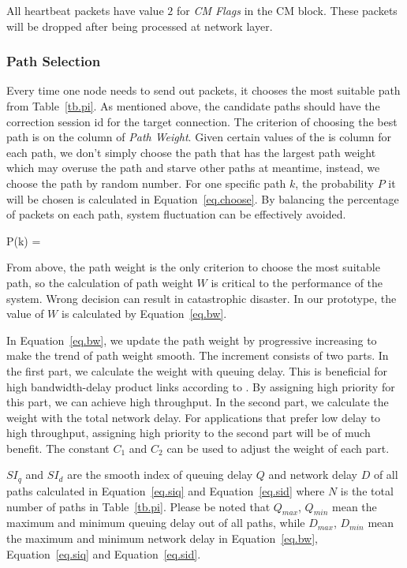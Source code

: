All heartbeat packets have value $2$ for \emph{CM Flags} in the CM block. These packets will be dropped after being processed at network layer.


\subsubsection{Path Selection}
\label{sec:selection}

Every time one node needs to send out packets, it chooses the most suitable path from Table~\ref{tb.pi}. As mentioned above, the candidate paths should have the correction session id for the target connection. The criterion of choosing the best path is on the column of \emph{Path Weight}. Given certain values of the is column for each path, we don\textquoteright t simply choose the path that has the largest path weight which may overuse the path and starve other paths at meantime, instead, we choose the path by random number. For one specific path $k$, the probability $P$ it will be chosen is calculated in Equation~\ref{eq.choose}. By balancing the percentage of packets on each path, system fluctuation can be effectively avoided.

\be
\label{eq.choose}
P(k) = 
\ee

From above, the path weight is the only criterion to choose the most suitable path, so the calculation of path weight $W$ is critical to the performance of the system. Wrong decision can result in catastrophic disaster. In our prototype, the value of $W$ is calculated by Equation~\ref{eq.bw}. 

In Equation~\ref{eq.bw}, we update the path weight by progressive increasing to make the trend of path weight smooth. The increment consists of two parts. In the first part, we calculate the weight with queuing delay. This is beneficial for high bandwidth-delay product links according to \cite{mptcp}. By assigning high priority for this part, we can achieve high throughput. In the second part, we calculate the weight with the total network delay. For applications that prefer low delay to high throughput, assigning high priority to the second part will be of much benefit. The constant $C_1$ and $C_2$ can be used to adjust the weight of each part.

$SI_q$ and $SI_d$ are the smooth index of queuing delay $Q$ and network delay $D$ of all paths calculated in Equation~\ref{eq.siq}  and Equation~\ref{eq.sid} where $N$ is the total number of paths in Table~\ref{tb.pi}. Please be noted that $Q_{max}$, $Q_{min}$ mean the maximum and minimum queuing delay out of all paths, while $D_{max}$, $D_{min}$ mean the maximum and minimum network delay in Equation~\ref{eq.bw}, Equation~\ref{eq.siq} and Equation~\ref{eq.sid}.
%

